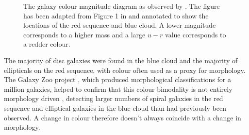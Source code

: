 \begin{figure}[t]
\caption[Galaxy Colour Magnitude Diagram from \cite{Baldry04}]{The galaxy colour magnitude diagram as observed by \cite{Baldry04}. The figure has been adapted from Figure 1 in \citeauthor{Baldry04} and annotated to show the locations of the red sequence and blue cloud. A lower magnitude corresponds to a higher mass and a large $u-r$ value corresponds to a redder colour.}
\label{fig:cmdbaldry}
\end{figure}


The majority of disc galaxies were found in the blue cloud and the majority of ellipticals on the red sequence, with colour often used as a proxy for morphology. The Galaxy Zoo project \citep{lintott08, Lintott11}, which produced morphological classifications for a million galaxies, helped to confirm that this colour bimodality is not entirely morphology driven \citep{Strat01, Salim07, Sch07, CHV08, Bamford09, Skibba09}, detecting larger numbers of spiral galaxies in the red sequence \citep{masters10c} and elliptical galaxies in the blue cloud \citep{Sch09} than had previously been observed. A change in colour therefore doesn't always coincide with a change in morphology. 

